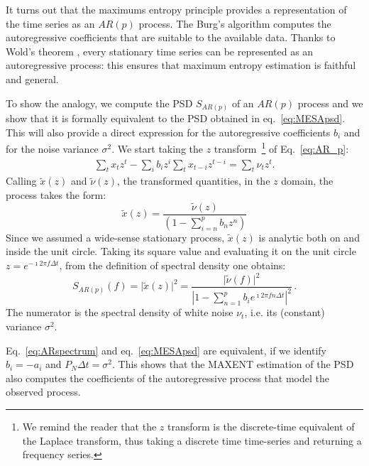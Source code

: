 \documentclass[twocolumn,showpacs,preprintnumbers,nofootinbib,prd,
superscriptaddress,10pt]{revtex4-1}
\begin{document}
It turns out that the maximums entropy principle provides a representation of the time series as an $AR(p)$ process. The Burg's algorithm computes the autoregressive coefficients that are suitable to the available data.
Thanks to Wold's theorem \cite{Wold_theorem}, every stationary time series can be represented as an autoregressive process: this ensures that maximum entropy estimation is faithful and general.

To show the analogy, we compute the PSD $S_{AR(p)}$ of an $AR(p)$ process and we show that it is formally equivalent to the PSD obtained in eq.~\eqref{eq:MESApsd}. This will also provide a direct expression for the autoregressive coefficients $b_i$ and for the noise variance $\sigma^2$.
We start taking the $z$ transform~\footnote{We remind the reader that the $z$ transform is the discrete-time equivalent of the Laplace transform, thus taking a discrete time time-series and returning a frequency series.} of Eq.~\eqref{eq:AR_p}: 
\begin{align}
    \sum_t x_t z^t - \sum_i b_i z^i\sum_t x_{t - i} z^{t - i} = \sum_t \nu_t z^t.
\end{align}
Calling $\tilde x(z)$ and $\tilde \nu (z)$, the transformed quantities, 
in the $z$ domain, the process takes the form:
\begin{equation}
    \tilde x(z) = \frac{\tilde\nu(z)}{\left(1 - \sum_{i = n}^p b_n z^n \right)}
\end{equation}
Since we assumed a wide-sense stationary process, $\tilde{x}(z)$ is analytic both on and inside the unit circle. Taking its square value and evaluating it on the unit circle $z = e^{-\imath 2 \pi f \Delta t}$, from the definition of spectral density one obtains:
\begin{equation}\label{eq:ARspectrum}
    S_{AR(p)}(f) = \vert \tilde x(z)\vert ^ 2 = 
    \frac{\vert \tilde \nu(f) \vert ^ 2}{\left\vert 1 - \sum_{n = 1}^p b_i e^{\imath 2 \pi f n \Delta t} \right\vert ^ 2}\,.
\end{equation}
The numerator is the spectral density of white noise $\nu_t$, i.e. its (constant) variance $\sigma^2$.

Eq.~\eqref{eq:ARspectrum} and eq.~\eqref{eq:MESApsd} are equivalent, if we identify $b_i = - a_i$ and $P_N \Delta t= \sigma ^ 2$.
This shows that the MAXENT estimation of the PSD also computes the coefficients of the autoregressive 
process that model the observed process.
\end{document}
